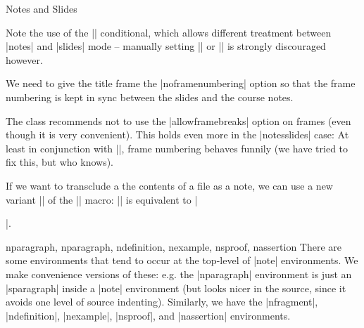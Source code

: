 \begin{sfragment}[id=sec:user:notesslides]{Notes and Slides}
\begin{function}{\ifnotes}
  Note the use of the |\ifnotes| conditional, which allows different treatment between
  |notes| and |slides| mode -- manually setting |\notestrue| or |\notesfalse| is strongly
  discouraged however.
\end{function}
 
\begin{dangerbox}
  We need to give the title frame the |noframenumbering| option so that the frame
  numbering is kept in sync between the slides and the course notes.
\end{dangerbox}

\begin{dangerbox}
  The  class recommends not to use the |allowframebreaks| option on frames
  (even though it is very convenient). This holds even more in the |notesslides| case: At
  least in conjunction with |\newpage|, frame numbering behaves funnily (we have tried to
  fix this, but who knows).
\end{dangerbox}
\end{sfragment}

\begin{function}{}
  If we want to transclude a the contents of a file as a note, we can use a new variant
  || of the || macro: || is equivalent to
  |\begin{note}\end{note}|.
\end{function}

\begin{environment}{nparagraph, nparagraph, ndefinition, nexample, nsproof, nassertion}
  There are some environments that tend to occur at the top-level of |note|
  environments. We make convenience versions of these: e.g. the |nparagraph| environment
  is just an |sparagraph| inside a |note| environment (but looks nicer in the source,
  since it avoids one level of source indenting). Similarly, we have the |nfragment|,
  |ndefinition|, |nexample|, |nsproof|, and |nassertion| environments.
\end{environment}

